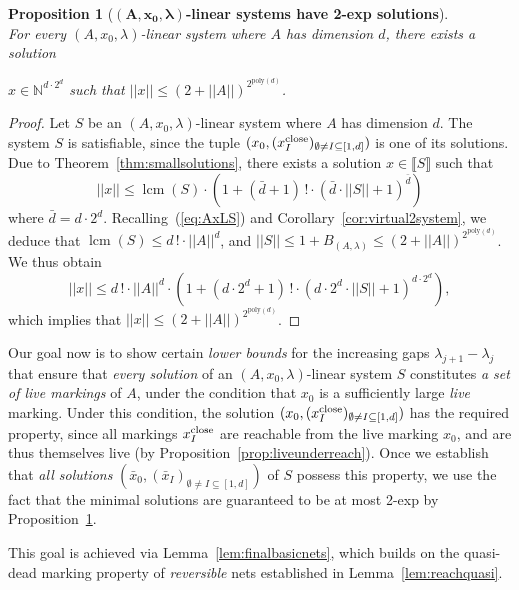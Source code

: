\documentclass[11pt,a4paper]{amsart}
\newcommand{\nnorm}[1]{||#1||}
\newcommand{\close}{\textnormal{close}}
\newcommand{\Nat}{\mathbb{N}}
\newcommand{\setN}{\Nat}
\newcommand{\sem}[1]{\llbracket#1\rrbracket}
\newcommand{\mlcm}[1]{\operatorname{lcm}(#1)}
\theoremstyle{plain}
\newtheorem{prop}[thm]{Proposition}
\theoremstyle{definition}
\theoremstyle{defC}
\theoremstyle{thmC}
\begin{document}
\begin{prop}[\textbf{$\bm{(A,x_0,\lambda)}$-linear systems have 
	2-exp	solutions}]\label{prop:Affsmall}
\hfill\\
For every $(A,x_0,\lambda)$-linear system where $A$ has 
 dimension $d$,
there exists a solution 
	\begin{center}
	$x\in\setN^{d\cdot 2^d}$ such that 
	$\nnorm{x}\leq (2+\nnorm{A})^{2^{\text{poly}(d)}}$.
	\end{center}
	\end{prop}	
\begin{proof} 
Let $S$ be an $(A,x_0,\lambda)$-linear system where  $A$ has dimension $d$.
The system $S$ is
satisfiable, since the tuple $(x_0,(x^\close_I)_{\emptyset\neq I\subseteq [1,d]})$ is one
of its solutions.
	Due to Theorem~\ref{thm:smallsolutions},
there exists a solution
	$x\in\sem{S}$ such that
	\[\nnorm{x}\leq
		\mlcm{S} \cdot \left(1+ (\bar{d}+1)\,!\cdot (\bar{d}\cdot
		\nnorm{S}+1)^{\bar{d}}\right)\]
	where 	$\bar{d}=d\cdot 2^d$.
Recalling~(\ref{eq:AxLS})
and Corollary~\ref{cor:virtual2system}, we deduce that
	$\mlcm{S}\leq d\,!\cdot\nnorm{A}^d$, and $\nnorm{S}\leq
	1+B_{(A,\lambda)}\leq 
	(2+\nnorm{A})^{2^{\text{poly}(d)}}$. 
We thus obtain
\[\nnorm{x}\leq d\,!\cdot\nnorm{A}^d\cdot
 \left(1+ (d\cdot 2^d+1)\,!\cdot (d\cdot 2^d\cdot
		\nnorm{S}+1)^{d\cdot 2^d}\right),\]
which implies that 
	$\nnorm{x}\leq(2+\nnorm{A})^{2^{\text{poly}(d)}}$.
\end{proof}

\noindent
Our goal now is to show certain \emph{lower bounds} for 
the increasing gaps
$\lambda_{j+1}-\lambda_j$ that ensure
that \emph{every solution} 
of an $(A,x_0,\lambda)$-linear system $S$
constitutes \emph{a set
of live markings} of $A$, under the condition that $x_0$ is a sufficiently
large \emph{live} marking.
Under this condition, the solution $(x_0,(x^\close_I)_{\emptyset\neq I\subseteq[1,d]})$ 
has the required property, since all markings $x^\close_I$ are reachable from
the live marking $x_0$, and are thus themselves live (by
Proposition~\ref{prop:liveunderreach}).
Once we establish that \emph{all solutions}
$(\bar{x}_0,(\bar{x}_I)_{\emptyset\neq I\subseteq[1,d]})$ of $S$ 
possess this property, we use the fact 
that the minimal solutions are guaranteed to be at most 2-exp by
Proposition~\ref{prop:Affsmall}.

This goal is achieved via Lemma~\ref{lem:finalbasicnets}, which builds on the quasi-dead marking property of \emph{reversible} nets established in Lemma~\ref{lem:reachquasi}.
\end{document}
